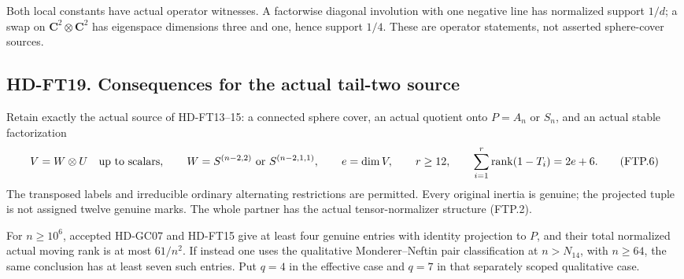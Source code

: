 Both local constants have actual operator witnesses.  A factorwise
diagonal involution with one negative line has normalized support
\(1/d\); a swap on \(\mathbf C^2\otimes\mathbf C^2\) has
eigenspace dimensions three and one, hence support \(1/4\).
These are operator statements, not asserted sphere-cover sources.

\subsection*{HD-FT19. Consequences for the actual tail-two source}

Retain exactly the actual source of HD-FT13--15: a connected sphere
cover, an actual quotient onto \(P=A_n\) or \(S_n\), and an actual
stable factorization
\[
 V=W\otimes U\quad\hbox{up to scalars},\qquad
 W=S^{(n-2,2)}\ \hbox{or}\ S^{(n-2,1,1)},\qquad
 e=\dim V,\qquad r\ge12,\qquad
 \sum_{i=1}^r\operatorname{rank}(1-T_i)=2e+6.
 \tag{FTP.6}
\]
The transposed labels and irreducible ordinary alternating
restrictions are permitted.  Every original inertia is genuine;
the projected tuple is not assigned twelve genuine marks.
The whole partner has the actual tensor-normalizer structure (FTP.2).

For \(n\ge10^6\), accepted HD-GC07 and HD-FT15 give at least four
genuine entries with identity projection to \(P\), and their total
normalized actual moving rank is at most \(61/n^2\).  If instead
one uses the qualitative Monderer--Neftin pair classification at
\(n>N_{14}\), with \(n\ge64\), the same conclusion has at least
seven such entries.  Put \(q=4\) in the effective case and \(q=7\)
in that separately scoped qualitative case.

